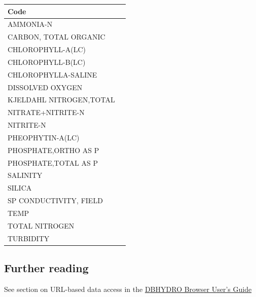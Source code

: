 \documentclass[12pt,notitlepage]{article}
\begin{document}
\begin{longtable}{| p{} | p{} |} 
\hline
Code\\
\hline
AMMONIA-N\\
CARBON, TOTAL ORGANIC\\
CHLOROPHYLL-A(LC)\\
CHLOROPHYLL-B(LC)\\
CHLOROPHYLLA-SALINE\\
DISSOLVED OXYGEN\\
KJELDAHL NITROGEN,TOTAL\\
NITRATE+NITRITE-N\\
NITRITE-N\\
PHEOPHYTIN-A(LC)\\
PHOSPHATE,ORTHO AS P\\
PHOSPHATE,TOTAL AS P\\
SALINITY\\
SILICA\\
SP CONDUCTIVITY, FIELD\\
TEMP\\
TOTAL NITROGEN\\
TURBIDITY\\
\hline
\end{longtable}

\subsection{Further reading}
See section on URL-based data access in the \href{http://www.sfwmd.gov/portal/page/portal/xrepository/sfwmd_repository_pdf/dbhydrobrowseruserdocumentation.pdf}{DBHYDRO Browser User's Guide}

\medskip
 


 
\end{document}
